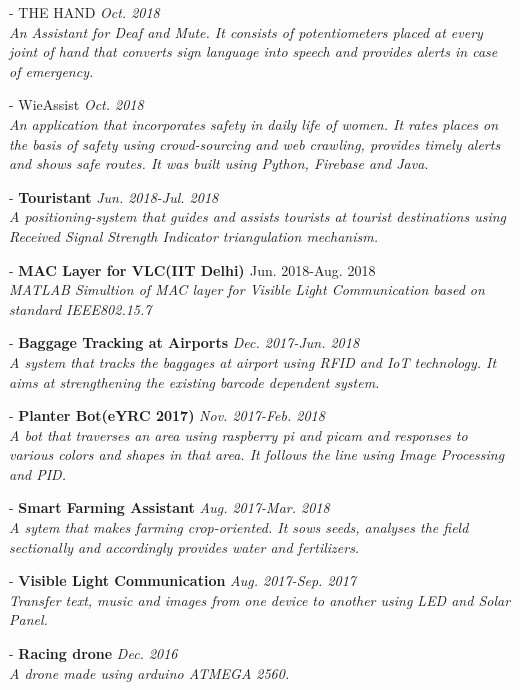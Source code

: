 \documentclass[margin, 10pt]{res} %
\begin{document}
\begin{resume}
- {THE HAND}
{\sl \hfill {\normalfont Oct. 2018}\\ An Assistant for Deaf and Mute.
It consists of potentiometers placed at every joint of hand that converts sign language into speech and provides alerts in case of emergency.}

- {WieAssist}
{\sl \hfill {\normalfont Oct. 2018}\\ An application that incorporates safety in daily life of women. 
It rates places on the basis of safety using crowd-sourcing and web crawling, provides timely alerts and shows safe routes. It was built using Python, Firebase and Java.}



- {\bf Touristant} 
{\sl \hfill {\normalfont Jun. 2018-Jul. 2018}\\ A positioning-system that guides and assists tourists at tourist destinations using Received Signal Strength Indicator triangulation mechanism. }

- {\bf {MAC Layer for VLC(IIT Delhi) }  }
 { \hfill \normalfont Jun. 2018-Aug. 2018}\\{\sl MATLAB Simultion of MAC layer for Visible Light Communication based on standard IEEE802.15.7}

- {\bf Baggage Tracking at Airports}
{\sl  \hfill {\normalfont Dec. 2017-Jun. 2018 }\\A system that tracks the baggages at airport using RFID and IoT technology. It aims at strengthening the existing barcode dependent system. }

- {\bf Planter Bot(eYRC 2017)} 
 {\sl \hfill {\normalfont Nov. 2017-Feb. 2018}\\A bot that traverses an area using raspberry pi and picam and responses to various colors and shapes in that area. It follows the line using Image Processing and PID.}

- {\bf Smart Farming Assistant}
{\sl \hfill{\normalfont Aug. 2017-Mar. 2018}\\ A sytem that makes farming crop-oriented. It sows seeds, analyses the field sectionally and accordingly provides water and fertilizers.}


- {\bf Visible Light Communication}
{\sl \hfill{\normalfont Aug. 2017-Sep. 2017}\\Transfer text, music and images from one device to another using LED and Solar Panel. }

- {\bf Racing drone}
{\sl  \hfill{\normalfont Dec. 2016}\\A drone made using arduino ATMEGA 2560.}


\end{resume}
\end{document}
